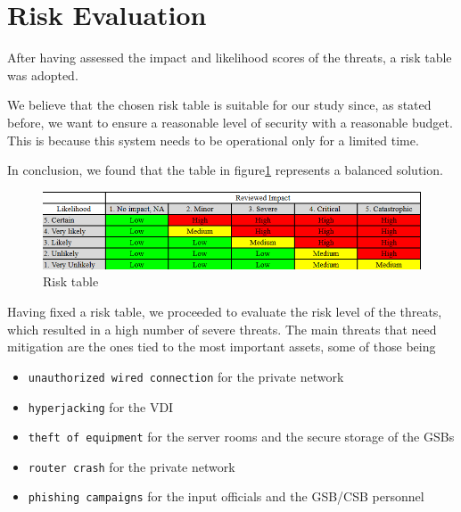 \section*{Risk Evaluation}

After having assessed the impact and likelihood scores of the threats, a risk table was adopted. 

We believe that the chosen risk table is suitable for our study since, as stated before, we want to ensure a reasonable level of security with a reasonable budget. This is because this system needs to be operational only for a limited time.

In conclusion, we found that the table in figure\ref{fig:riskTable} represents a balanced solution. 

\begin{figure}[]
    \centering
    \includegraphics[keepaspectratio,width=1\textwidth]{03-risk-analysis/004-RE/img/riskTable.png}
    \caption{Risk table}
    \label{fig:riskTable}
\end{figure}

Having fixed a risk table, we proceeded to evaluate the risk level of the threats, which resulted in a high number of severe threats. The main threats that need mitigation are the ones tied to the most important assets, some of those being

\begin{itemize}
    \item \texttt{unauthorized wired connection} for the private network
    \item \texttt{hyperjacking} for the VDI
    \item \texttt{theft of equipment} for the server rooms and the secure storage of the GSBs
    \item \texttt{router crash} for the private network
    \item \texttt{phishing campaigns} for the input officials and the GSB/CSB personnel
\end{itemize}

